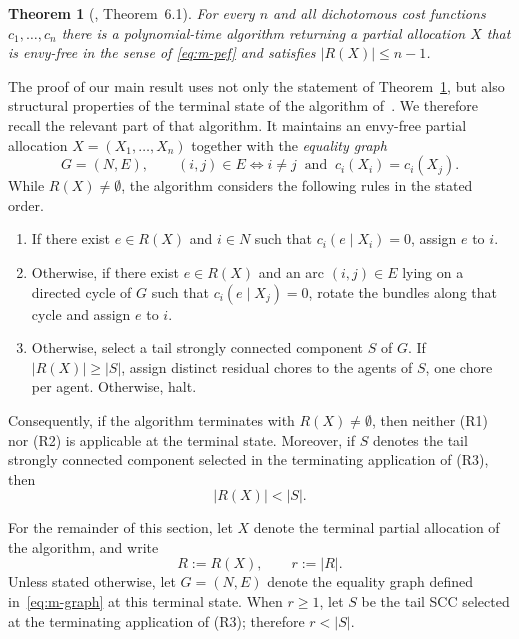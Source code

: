 \documentclass[sigconf,anonymous]{aamas}
\newcommand{\agents}{N}
\newcommand{\cost}{c}
\newcommand{\abs}[1]{\left\lvert#1\right\rvert}
\theoremstyle{acmplain}
\newtheorem{theorem}{Theorem}[section]
\theoremstyle{acmdefinition}
\theoremstyle{acmplain}
\begin{document}
\begin{theorem}[\cite{tao2025existence}, Theorem~6.1] \label{thm:m-twyz} For every $n$ and all dichotomous cost functions $\cost_1,\dots,\cost_n$ there is a polynomial-time algorithm returning a partial allocation $X$ that is envy-free in the sense of \eqref{eq:m-pef} and satisfies $\abs{R(X)} \le n-1$. \end{theorem}

The proof of our main result uses not only the statement of Theorem~\ref{thm:m-twyz}, but also structural properties of the terminal state of the algorithm of~\cite{tao2025existence}. We therefore recall the relevant part of that algorithm. It maintains an envy-free partial allocation $X=(X_1,\dots,X_n)$ together with the \emph{equality graph}
\begin{equation}
\label{eq:m-graph}
  G=(\agents,E),
  \qquad
  (i,j)\in E
  \iff
  i\ne j \ \text{ and }\ \cost_i(X_i)=\cost_i(X_j).
\end{equation}
While $R(X)\ne\emptyset$, the algorithm considers the following rules in the stated order.
\begin{enumerate}
  \item[(R1)] If there exist $e\in R(X)$ and $i\in\agents$ such that
        $\cost_i(e\mid X_i)=0$, assign $e$ to $i$.

  \item[(R2)] Otherwise, if there exist $e\in R(X)$ and an arc      $(i,j)\in E$ lying on a directed cycle of $G$ such that $\cost_i(e\mid X_j)=0$, rotate the bundles along that cycle and assign $e$ to $i$.

 \item[(R3)] Otherwise, select a tail strongly connected component $S$ of $G$. If $\abs{R(X)}\geq\abs S$, assign distinct residual chores to the agents of $S$, one chore per agent. Otherwise, halt. \end{enumerate}           Consequently, if the algorithm terminates with \(R(X)\neq\emptyset\), then neither (R1) nor (R2) is applicable at the terminal state. Moreover, if \(S\) denotes the tail strongly connected component selected in the terminating application of (R3), then
\[
    \abs{R(X)}<\abs S.
\]



For the remainder of this section, let $X$ denote the terminal partial allocation of the algorithm, and write
\[
    R:=R(X), \qquad r:=\abs R.
\]
Unless stated otherwise, let $G=(\agents,E)$ denote the equality graph defined in~\eqref{eq:m-graph} at this terminal state. When \(r\ge1\), let \(S\) be the tail SCC selected at the terminating application of (R3); therefore \(r<|S|\).
\end{document}
